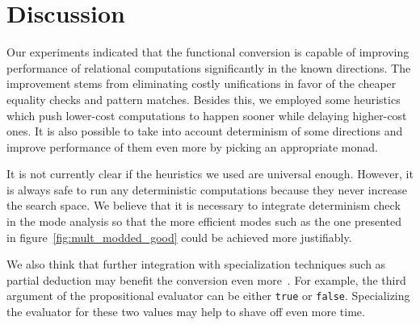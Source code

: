 \section{Discussion}

Our experiments indicated that the functional conversion is capable of improving performance of relational computations significantly in the known directions.
The improvement stems from eliminating costly unifications in favor of the cheaper equality checks and pattern matches.
Besides this, we employed some heuristics which push lower-cost computations to happen sooner while delaying higher-cost ones.
It is also possible to take into account determinism of some directions and improve performance of them even more by picking an appropriate monad.

It is not currently clear if the heuristics we used are universal enough.
However, it is always safe to run any deterministic computations because they never increase the search space.
We believe that it is necessary to integrate determinism check in the mode analysis so that the more efficient modes such as the one presented in figure~\ref{fig:mult_modded_good} could be achieved more justifiably.

We also think that further integration with specialization techniques such as partial deduction may benefit the conversion even more~\cite{verbitskaia2021empirical}.
For example, the third argument of the propositional evaluator can be either \lstinline{true} or \lstinline{false}.
Specializing the evaluator for these two values may help to shave off even more time.
